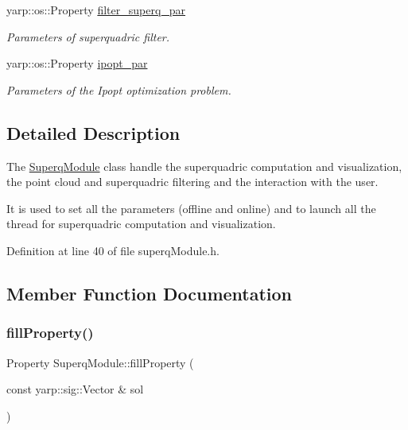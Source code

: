 \begin{DoxyCompactItemize}
\mbox{\label{classSuperqModule_ac9c130b5960c724aed615bbf6ac17b50}} 
yarp\+::os\+::\+Property \mbox{\hyperlink{classSuperqModule_ac9c130b5960c724aed615bbf6ac17b50}{filter\+\_\+superq\+\_\+par}}
\begin{DoxyCompactList}\small\item\em Parameters of superquadric filter. \end{DoxyCompactList}\item 
\mbox{\label{classSuperqModule_a6469063a5f34843741f727696d1803e1}} 
yarp\+::os\+::\+Property \mbox{\hyperlink{classSuperqModule_a6469063a5f34843741f727696d1803e1}{ipopt\+\_\+par}}
\begin{DoxyCompactList}\small\item\em Parameters of the Ipopt optimization problem. \end{DoxyCompactList}\end{DoxyCompactItemize}


\subsection{Detailed Description}
The \mbox{\hyperlink{classSuperqModule}{Superq\+Module}} class handle the superquadric computation and visualization, the point cloud and superquadric filtering and the interaction with the user. 

It is used to set all the parameters (offline and online) and to launch all the thread for superquadric computation and visualization. 

Definition at line 40 of file superq\+Module.\+h.



\subsection{Member Function Documentation}
\mbox{\label{classSuperqModule_ae2935a960968a6354462a728e16d60b0}} 
\subsubsection{\texorpdfstring{fill\+Property()}{fillProperty()}}
{\footnotesize\ttfamily Property Superq\+Module\+::fill\+Property (\begin{DoxyParamCaption}\item[{const yarp\+::sig\+::\+Vector \&}]{sol }\end{DoxyParamCaption})\hspace{0.3cm}{\ttfamily [protected]}}



